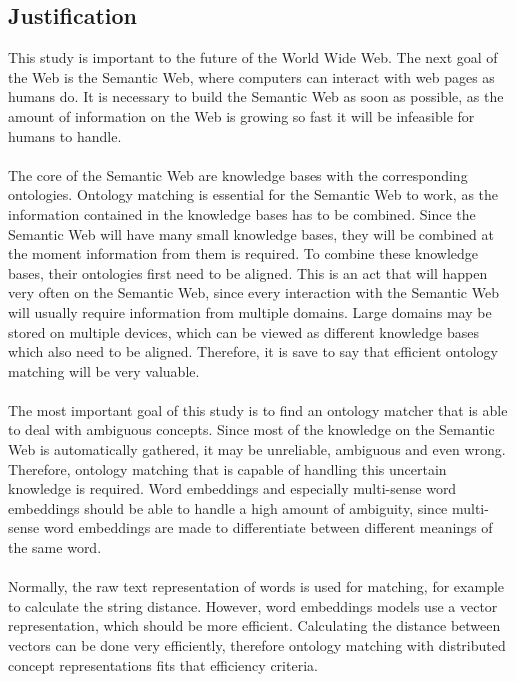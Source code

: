 \documentclass{article}
\begin{document}
 \subsection{Justification} 
 This study is important to the future of the World Wide Web. The next goal of the Web is the Semantic Web, where computers can interact with web pages as humans do. It is necessary to build the Semantic Web as soon as possible, as the amount of information on the Web is growing so fast it will be infeasible for humans to handle\cite{overload}.
 \paragraph{}
 The core of the Semantic Web are knowledge bases with the corresponding ontologies. Ontology matching is essential for the Semantic Web to work, as the information contained in the knowledge bases has to be combined. Since the Semantic Web will have many small knowledge bases, they will be combined at the moment information from them is required. To combine these knowledge bases, their ontologies first need to be aligned. This is an act that will happen very often on the Semantic Web, since every interaction with the Semantic Web will usually require information from multiple domains. Large domains may be stored on multiple devices, which can be viewed as different knowledge bases which also need to be aligned. Therefore, it is save to say that efficient ontology matching will be very valuable.
 \paragraph{}
 The most important goal of this study is to find an ontology matcher that is able to deal with ambiguous concepts. Since most of the knowledge on the Semantic Web is automatically gathered, it may be unreliable, ambiguous and even wrong. Therefore, ontology matching that is capable of handling this uncertain knowledge is required. Word embeddings and especially multi-sense word embeddings should be able to handle a high amount of ambiguity, since multi-sense word embeddings are made to differentiate between different meanings of the same word.
 \paragraph{}
 Normally, the raw text representation of words is used for matching, for example to calculate the string distance. However, word embeddings models use a vector representation, which should be more efficient.
 Calculating the distance between vectors can be done very efficiently, therefore ontology matching with distributed concept representations fits that efficiency criteria. 
\end{document}
